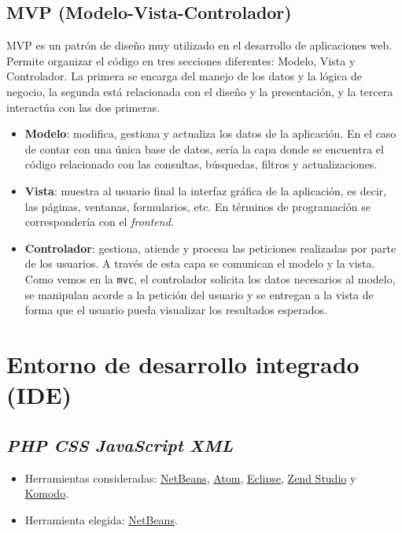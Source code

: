 \subsection{MVP (Modelo-Vista-Controlador)}

MVP es un patrón de diseño muy utilizado en el desarrollo de
aplicaciones web. Permite organizar el código en tres secciones
diferentes: Modelo, Vista y Controlador. La primera se encarga del
manejo de los datos y la lógica de negocio, la segunda está relacionada
con el diseño y la presentación, y la tercera interactúa con las dos
primeras.


\begin{itemize}
\tightlist
\item
  \textbf{Modelo}: modifica, gestiona y actualiza los datos de la
  aplicación. En el caso de contar con una única base de datos, sería la
  capa donde se encuentra el código relacionado con las consultas,
  búsquedas, filtros y actualizaciones.
\item
  \textbf{Vista}: muestra al usuario final la interfaz gráfica de la
  aplicación, es decir, las páginas, ventanas, formularios, etc. En
  términos de programación se correspondería con el \emph{frontend}.
\item
  \textbf{Controlador}: gestiona, atiende y procesa las peticiones
  realizadas por parte de los usuarios. A través de esta capa se
  comunican el modelo y la vista. Como vemos en la \texttt{mvc}, el
  controlador solicita los datos necesarios al modelo, se manipulan
  acorde a la petición del usuario y se entregan a la vista de forma que
  el usuario pueda visualizar los resultados esperados.
\end{itemize}

\section{Entorno de desarrollo integrado (IDE)}

\subsection{\emph{PHP} \textbar{} \emph{CSS} \textbar{} \emph{JavaScript} \textbar{} \emph{XML}}

\begin{itemize}
\tightlist
\item
  Herramientas consideradas: \href{https://netbeans.org/}{NetBeans},
  \href{https://atom.io/}{Atom}, \href{https://eclipse.org/}{Eclipse},
  \href{https://www.zend.com/products/zend-studio}{Zend Studio} y
  \href{https://www.activestate.com/products/komodo-ide/}{Komodo}.
\item
  Herramienta elegida: \href{https://netbeans.org/}{NetBeans}.
\end{itemize}

